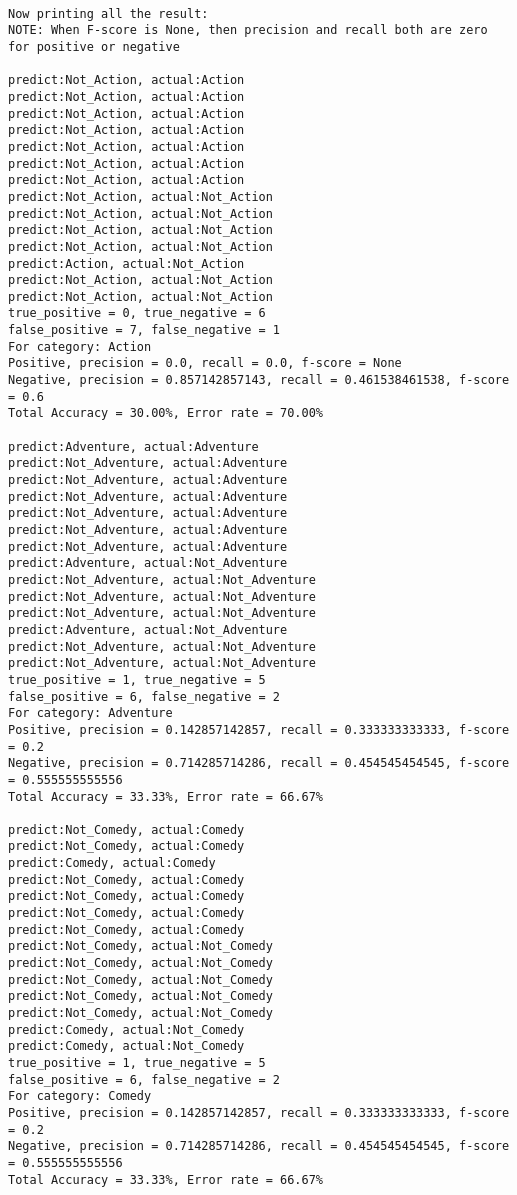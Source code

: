 \documentclass{article}
\begin{document}
\begin{lstlisting}

Now printing all the result:
NOTE: When F-score is None, then precision and recall both are zero for positive or negative

predict:Not_Action, actual:Action
predict:Not_Action, actual:Action
predict:Not_Action, actual:Action
predict:Not_Action, actual:Action
predict:Not_Action, actual:Action
predict:Not_Action, actual:Action
predict:Not_Action, actual:Action
predict:Not_Action, actual:Not_Action
predict:Not_Action, actual:Not_Action
predict:Not_Action, actual:Not_Action
predict:Not_Action, actual:Not_Action
predict:Action, actual:Not_Action
predict:Not_Action, actual:Not_Action
predict:Not_Action, actual:Not_Action
true_positive = 0, true_negative = 6
false_positive = 7, false_negative = 1
For category: Action
Positive, precision = 0.0, recall = 0.0, f-score = None 
Negative, precision = 0.857142857143, recall = 0.461538461538, f-score = 0.6 
Total Accuracy = 30.00%, Error rate = 70.00%

predict:Adventure, actual:Adventure
predict:Not_Adventure, actual:Adventure
predict:Not_Adventure, actual:Adventure
predict:Not_Adventure, actual:Adventure
predict:Not_Adventure, actual:Adventure
predict:Not_Adventure, actual:Adventure
predict:Not_Adventure, actual:Adventure
predict:Adventure, actual:Not_Adventure
predict:Not_Adventure, actual:Not_Adventure
predict:Not_Adventure, actual:Not_Adventure
predict:Not_Adventure, actual:Not_Adventure
predict:Adventure, actual:Not_Adventure
predict:Not_Adventure, actual:Not_Adventure
predict:Not_Adventure, actual:Not_Adventure
true_positive = 1, true_negative = 5
false_positive = 6, false_negative = 2
For category: Adventure
Positive, precision = 0.142857142857, recall = 0.333333333333, f-score = 0.2 
Negative, precision = 0.714285714286, recall = 0.454545454545, f-score = 0.555555555556 
Total Accuracy = 33.33%, Error rate = 66.67%

predict:Not_Comedy, actual:Comedy
predict:Not_Comedy, actual:Comedy
predict:Comedy, actual:Comedy
predict:Not_Comedy, actual:Comedy
predict:Not_Comedy, actual:Comedy
predict:Not_Comedy, actual:Comedy
predict:Not_Comedy, actual:Comedy
predict:Not_Comedy, actual:Not_Comedy
predict:Not_Comedy, actual:Not_Comedy
predict:Not_Comedy, actual:Not_Comedy
predict:Not_Comedy, actual:Not_Comedy
predict:Not_Comedy, actual:Not_Comedy
predict:Comedy, actual:Not_Comedy
predict:Comedy, actual:Not_Comedy
true_positive = 1, true_negative = 5
false_positive = 6, false_negative = 2
For category: Comedy
Positive, precision = 0.142857142857, recall = 0.333333333333, f-score = 0.2 
Negative, precision = 0.714285714286, recall = 0.454545454545, f-score = 0.555555555556 
Total Accuracy = 33.33%, Error rate = 66.67%


\end{lstlisting}
\end{document}
